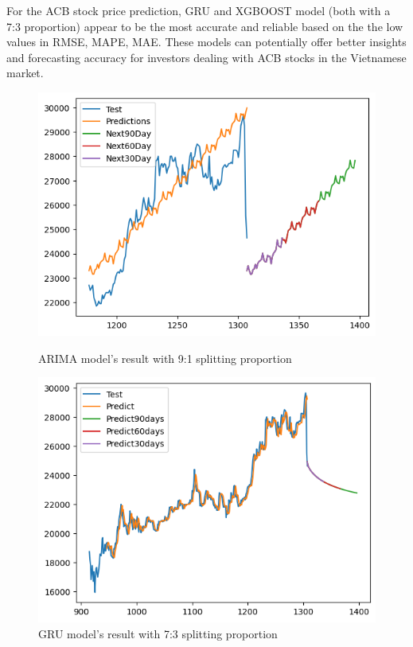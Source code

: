 \documentclass{ieeeojies}
\begin{document}
For the ACB stock price prediction, GRU and XGBOOST model (both with a 7:3 proportion) appear to be the most accurate and reliable based on the the low
values in RMSE, MAPE, MAE. These models can potentially offer better insights and forecasting accuracy for investors dealing with ACB stocks in the Vietnamese market.
\begin{figure}[H]
    \centering
    \begin{minipage}{0.45\linewidth}
        \centering
        \includegraphics[width=\linewidth]{bibliography/diagram/ARIMA-ACB.png}
        \caption{ARIMA model’s result with 9:1 splitting proportion}
        \label{fig:ARIMA}
    \end{minipage}
    \hfill
    \begin{minipage}{0.45\linewidth}
        \centering
        \includegraphics[width=\linewidth]{bibliography/diagram/GRU-ACB.png}
        \caption{GRU model’s result with 7:3 splitting proportion}
        \label{fig:GRU}
    \end{minipage}
\end{figure}
\end{document}
